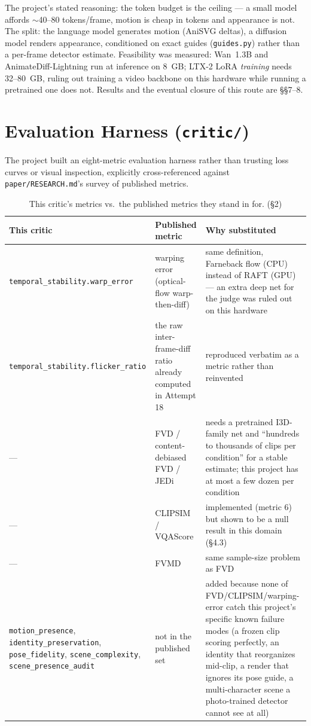 \documentclass[11pt]{article}
\newcommand{\secsym}{\S}
\begin{document}
The project's stated reasoning: the token budget is the ceiling --- a
small model affords $\sim$40--80 tokens/frame, motion is cheap in tokens
and appearance is not. The split: the language model generates motion
(AniSVG deltas), a diffusion model renders appearance, conditioned on
exact guides (\texttt{guides.py}) rather than a per-frame detector
estimate. Feasibility was measured: Wan~1.3B and AnimateDiff-Lightning run
at inference on 8~GB; LTX-2 LoRA \emph{training} needs 32--80~GB, ruling
out training a video backbone on this hardware while running a pretrained
one does not. Results and the eventual closure of this route are
\secsym\secsym7--8.

\section{Evaluation Harness (\texttt{critic/})}
\label{sec:critic}

The project built an eight-metric evaluation harness rather than trusting
loss curves or visual inspection, explicitly cross-referenced against
\texttt{paper/RESEARCH.md}'s survey of published metrics.

\begin{table}[h]
\centering
\small
\caption{This critic's metrics vs.\ the published metrics they stand in
for. (\secsym2)}
\label{tab:critic-vs-published}
\begin{tabular}{@{}L{3.3cm}L{4.2cm}L{6.5cm}@{}}
\toprule
This critic & Published metric & Why substituted \\
\midrule
\texttt{temporal\_stability.warp\_error} & warping error (optical-flow
  warp-then-diff) & same definition, Farneback flow (CPU) instead of RAFT
  (GPU) --- an extra deep net for the judge was ruled out on this
  hardware \\
\texttt{temporal\_stability.flicker\_ratio} & the raw inter-frame-diff
  ratio already computed in Attempt 18 & reproduced verbatim as a metric
  rather than reinvented \\
--- & FVD / content-debiased FVD / JEDi & needs a pretrained I3D-family
  net and ``hundreds to thousands of clips per condition'' for a stable
  estimate; this project has at most a few dozen per condition \\
--- & CLIPSIM / VQAScore & implemented (metric 6) but shown to be a null
  result in this domain (\secsym4.3) \\
--- & FVMD & same sample-size problem as FVD \\
\texttt{motion\_presence}, \texttt{identity\_preservation},
  \texttt{pose\_fidelity}, \texttt{scene\_complexity},
  \texttt{scene\_presence\_audit} & not in the published set & added
  because none of FVD/CLIPSIM/warping-error catch this project's specific
  known failure modes (a frozen clip scoring perfectly, an identity that
  reorganizes mid-clip, a render that ignores its pose guide, a
  multi-character scene a photo-trained detector cannot see at all) \\
\bottomrule
\end{tabular}
\end{table}
\end{document}
